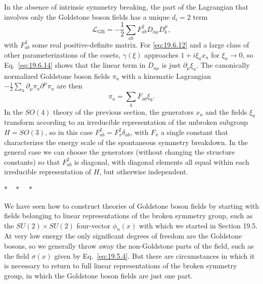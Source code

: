 In the absence of intrinsic symmetry breaking, the part of the Lagrangian that involves only the Goldstone boson fields has a unique $d_i=2$ term
\begin{equation}
\mathcal L_{\mathrm{GB}}
=-\frac{1}{2}\sum_{ab}F^2_{ab}D_{a\mu}D_b^{\mu},
\tag{19.6.46}\label{eq:19.6.46}
\end{equation}
with $F^2_{ab}$ some real positive-definite matrix. For \eqref{eq:19.6.12} and a large class of other parameterizations of the cosets, $\gamma(\xi)$ approaches $1+i\xi_ax_a$ for $\xi_a\to0$, so Eq.~\eqref{eq:19.6.14} shows that the linear term in $D_{a\mu}$ is just $\partial_\mu\xi_a$. The canonically normalized Goldstone boson fields $\pi_a$ with a kinematic Lagrangian $-\tfrac12\sum_a\partial_\mu\pi_a\partial^\mu\pi_a$ are then
\begin{equation}
\pi_a=\sum_bF_{ab}\xi_b.
\tag{19.6.47}\label{eq:19.6.47}
\end{equation}
In the $SO(4)$ theory of the previous section, the generators $x_a$ and the fields $\xi_a$ transform according to an irreducible representation of the unbroken subgroup $H=SO(3)$, so in this case $F^2_{ab}=F_\pi^2\delta_{ab}$, with $F_\pi$ a single constant that characterizes the energy scale of the spontaneous symmetry breakdown. In the general case we can choose the generators (without changing the structure constants) so that $F^2_{ab}$ is diagonal, with diagonal elements all equal within each irreducible representation of $H$, but otherwise independent.

\begin{center}
$\ast\quad\ast\quad\ast$
\end{center}

We have seen how to construct theories of Goldstone boson fields by starting with fields belonging to linear representations of the broken symmetry group, such as the $SU(2)\times SU(2)$ four-vector $\phi_n(x)$ with which we started in Section 19.5. At very low energy the only significant degrees of freedom are the Goldstone bosons, so we generally throw away the non-Goldstone parts of the field, such as the field $\sigma(x)$ given by Eq.~\eqref{eq:19.5.4}. But there are circumstances in which it is necessary to return to full linear representations of the broken symmetry group, in which the Goldstone boson fields are just one part.

